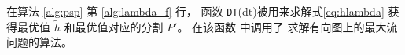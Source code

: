 在算法 \ref{alg:psp} 第 \ref{alg:lambda_f} 行，
函数 \texttt{DT}(\glsdesc{dt})被用来求解式\eqref{eq:hlambda} 获得最优值
$\tilde{h}$ 和最优值对应的分割 $P'$。
%
在该函数
中调用了
求解有向图上的最大流问题的算法。
%
